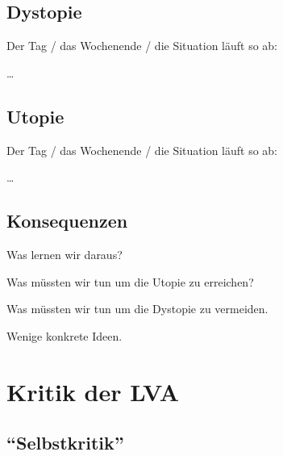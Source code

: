 \documentclass[twoside, a4paper, DIV=11, open=any, bibliography=totoc]{scrbook}
\begin{document}
\section{Dystopie} \label{sec:szendystopie}

Der Tag / das Wochenende / die Situation läuft so ab:

\ldots

\section{Utopie} \label{sec:szenutopie}

Der Tag / das Wochenende / die Situation läuft so ab:

\ldots

\section{Konsequenzen} \label{sec:szenkonsequenzen}

Was lernen wir daraus?

Was müssten wir tun um die Utopie zu erreichen?

Was müssten wir tun um die Dystopie zu vermeiden.

Wenige konkrete Ideen.



\chapter{Kritik der LVA} \label{chap:lvakritik}

\section{"`Selbstkritik"'}
\end{document}
